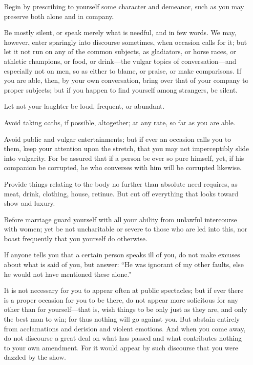 Begin by prescribing  to yourself some character and demeanor,  such as you may
preserve both alone and in company.

Be mostly silent,  or speak merely what  is needful, and in few  words. We may,
however, enter sparingly into discourse  sometimes, when occasion calls for it;
but let  it not  run on  any of the  common subjects,  as gladiators,  or horse
races,  or  athletic  champions,  or  food, or  drink---the  vulgar  topics  of
conversation---and especially not on men, so  as either to blame, or praise, or
make comparisons. If  you are able, then, by your  own conversation, bring over
that of  your company to  proper subjects; but if  you happen to  find yourself
among strangers, be silent.

Let not your laughter be loud, frequent, or abundant.

Avoid taking  oaths, if possible,  altogether; at any rate,  so far as  you are
able.

Avoid public  and vulgar entertainments; but  if ever an occasion  calls you to
them, keep  your attention  upon the  stretch, that  you may  not imperceptibly
slide into vulgarity. For be assured that  if a person be ever so pure himself,
yet, if his companion be corrupted, he who converses with him will be corrupted
likewise.

Provide things relating to the body  no further than absolute need requires, as
meat, drink, clothing, house, retinue. But cut off everything that looks toward
show and luxury.

Before marriage guard yourself with  all your ability from unlawful intercourse
with women; yet be  not uncharitable or severe to those who  are led into this,
nor boast frequently that you yourself do otherwise.

If  anyone tells  you that  a certain  person speaks  ill of  you, do  not make
excuses about what  is said of you,  but answer: ``He was ignorant  of my other
faults, else he would not have mentioned these alone.''

It is not necessary  for you to appear often at public  spectacles; but if ever
there is a proper  occasion for you to be there, do  not appear more solicitous
for any other than for yourself---that is,  wish things to be only just as they
are, and only  the best man to win;  for thus nothing will go  against you. But
abstain entirely from acclamations and  derision and violent emotions. And when
you  come away,  do not  discourse a  great deal  on what  has passed  and what
contributes  nothing  to your  own  amendment.  For  it  would appear  by  such
discourse that you were dazzled by the show.

